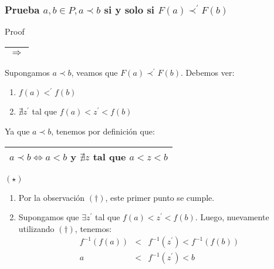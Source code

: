 \begin{frame}
	\frametitle{Prueba $a, b \in P, a \prec b$ si y solo si $F(a) \prec^{\prime} F(b)$}

	\begin{block}{Proof}
		\PN \begin{tabular}{|c|} \hline $\Rightarrow$ \\\hline \end{tabular} Supongamos $a \prec b$, veamos que $F(a)
		\prec^{\prime} F(b)$. Debemos ver:
	  \begin{enumerate}[1)]
	    \item $f(a) <^{\prime} f(b)$
	    \item $\nexists z^{\prime}$ tal que $f(a) < z^{\prime} < f(b)$
	  \end{enumerate}

		\vspace{2mm}
	  \PN Ya que $a \prec b$, tenemos por definición que:
		\begin{center}
			\begin{tabular}{|c|}
				\hline $a \prec b \Leftrightarrow a < b$ y  $\nexists z$ tal que $a < z < b$ \\\hline
			\end{tabular} $(\star)$
		\end{center}

		\begin{enumerate}
	  	\item Por la observación $(\dag)$, este primer punto se cumple.
			\item Supongamos que $\exists z^{\prime}$ tal que $f(a) < z^{\prime} < f(b)$. Luego, nuevamente utilizando
			$(\dag)$, tenemos:
			\begin{eqnarray*}
	  		f^{-1}(f(a)) &<& f^{-1}(z^{\prime}) < f^{-1}(f(b)) \\
				a &<& f^{-1}(z^{\prime}) < b
			\end{eqnarray*}
		\end{enumerate}
	\end{block}
\end{frame}
